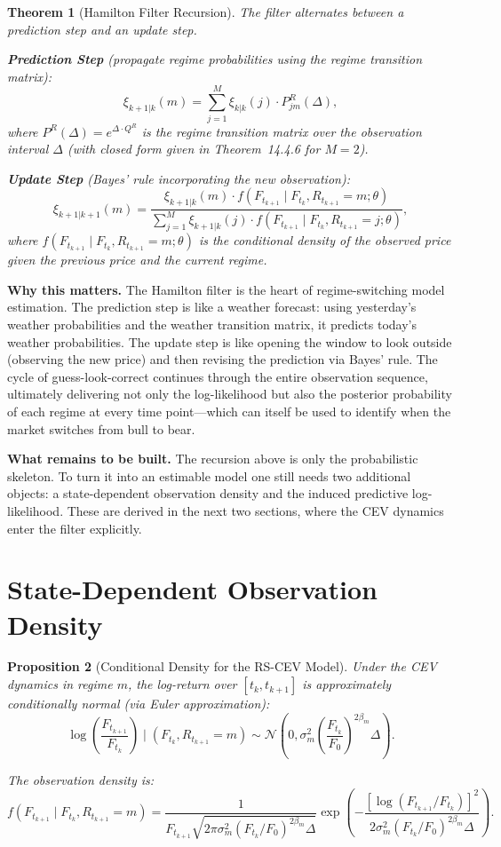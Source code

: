 \documentclass[11pt,a4paper,openany]{book}
\theoremstyle{definition}
\theoremstyle{plain}
\newtheorem{theorem}{Theorem}[chapter]
\newtheorem{proposition}[theorem]{Proposition}
\theoremstyle{remark}
\newcommand{\1}{\mathbbm{1}}
\begin{document}
\begin{theorem}[Hamilton Filter Recursion]
The filter alternates between a prediction step and an update step.

\textbf{Prediction Step} (propagate regime probabilities using the regime transition matrix):
\[
\xi_{k+1|k}(m) = \sum_{j=1}^{M} \xi_{k|k}(j) \cdot P_{jm}^{R}(\Delta),
\]
where $P^{R}(\Delta) = e^{\Delta \cdot Q^{R}}$ is the regime transition matrix over the observation interval $\Delta$ (with closed form given in Theorem~14.4.6 for $M=2$).

\textbf{Update Step} (Bayes' rule incorporating the new observation):
\[
\xi_{k+1|k+1}(m) = \frac{\xi_{k+1|k}(m) \cdot f(F_{t_{k+1}} \mid F_{t_{k}}, R_{t_{k+1}} = m; \theta)}{\sum_{j=1}^{M} \xi_{k+1|k}(j) \cdot f(F_{t_{k+1}} \mid F_{t_{k}}, R_{t_{k+1}} = j; \theta)},
\]
where $f(F_{t_{k+1}} \mid F_{t_{k}}, R_{t_{k+1}} = m; \theta)$ is the conditional density of the observed price given the previous price and the current regime.
\end{theorem}

\medskip
\noindent\textbf{Why this matters.} The Hamilton filter is the heart of regime-switching model estimation. The prediction step is like a weather forecast: using yesterday's weather probabilities and the weather transition matrix, it predicts today's weather probabilities. The update step is like opening the window to look outside (observing the new price) and then revising the prediction via Bayes' rule. The cycle of guess-look-correct continues through the entire observation sequence, ultimately delivering not only the log-likelihood but also the posterior probability of each regime at every time point---which can itself be used to identify when the market switches from bull to bear.

\medskip
\noindent\textbf{What remains to be built.} The recursion above is only the probabilistic skeleton. To turn it into an estimable model one still needs two additional objects: a state-dependent observation density and the induced predictive log-likelihood. These are derived in the next two sections, where the CEV dynamics enter the filter explicitly.

\section{State-Dependent Observation Density}

\begin{proposition}[Conditional Density for the RS-CEV Model]
Under the CEV dynamics in regime $m$, the log-return over $[t_{k}, t_{k+1}]$ is approximately conditionally normal (via Euler approximation):
\[
\log\left(\frac{F_{t_{k+1}}}{F_{t_{k}}}\right) \mid (F_{t_{k}}, R_{t_{k+1}} = m) \sim \mathcal{N}\left(0, \sigma_{m}^{2} \left(\frac{F_{t_{k}}}{F_{0}}\right)^{2\beta_{m}} \Delta \right).
\]

The observation density is:
\[
f(F_{t_{k+1}} \mid F_{t_{k}}, R_{t_{k+1}} = m) = \frac{1}{F_{t_{k+1}} \sqrt{2\pi \sigma_{m}^{2} (F_{t_{k}}/F_{0})^{2\beta_{m}} \Delta}} \exp\left(-\frac{\left[\log(F_{t_{k+1}}/F_{t_{k}})\right]^{2}}{2 \sigma_{m}^{2} (F_{t_{k}}/F_{0})^{2\beta_{m}} \Delta}\right).
\]
\end{proposition}
\end{document}
